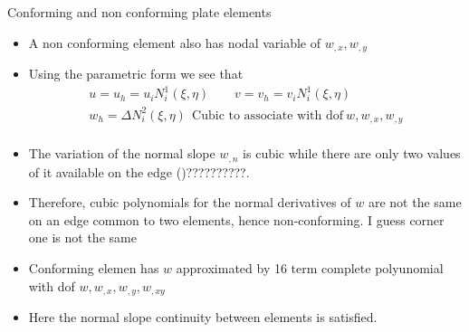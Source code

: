 	\begin{frame}{Conforming and non conforming plate elements}
		\begin{itemize}
			\item A non conforming element also has nodal variable of $w_{,x},w_{,y}$
			\item Using the parametric form we see that 
			\begin{equation}
				\begin{aligned}
				u = u_h =  u_i N^1_i(\xi,\eta) \qquad v = v_h =  v_iN^1_i(\xi,\eta) \\
				w_h = \Delta N^2_i(\xi,\eta) ~~\text{Cubic to associate with dof}~ w,w_{,x},w_{,y}\\			
				\end{aligned}
			\end{equation}
			\item The variation of the normal slope $w_{,n}$ is cubic while there are only two values of it available on the edge ()??????????.
			\item Therefore, cubic polynomials for the normal derivatives of $w$ are not the same on an edge common to two elements, hence non-conforming. I guess corner one is not the same 
			\item Conforming elemen has $w$ approximated by 16 term complete polyunomial with dof $w, w_{,x},w_{,y},w_{,xy}$
			\item Here the normal slope continuity between elements is satisfied.
			\end{itemize}
	\end{frame}


